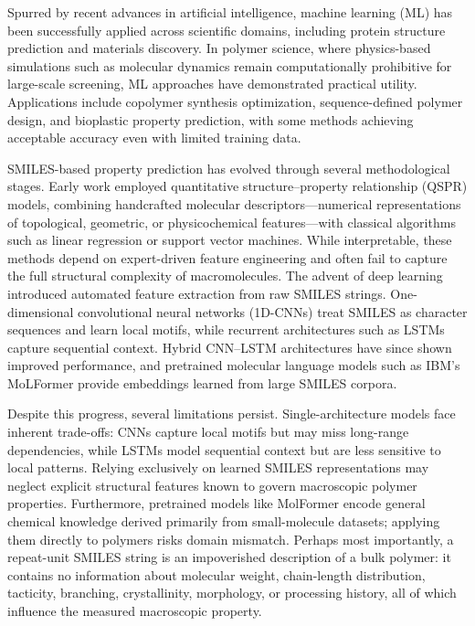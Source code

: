 \documentclass{article}
\begin{document}
Spurred by recent advances in artificial intelligence, machine learning (ML) has been successfully applied across scientific domains, including protein structure prediction and materials discovery.\cite{martin_emerging_2023, ge_machine_2025} In polymer science, where physics-based simulations such as molecular dynamics remain computationally prohibitive for large-scale screening, ML approaches have demonstrated practical utility.\cite{martin_emerging_2023, ge_machine_2025} Applications include copolymer synthesis optimization,\cite{reis_machine-learning-guided_2021} sequence-defined polymer design,\cite{webb_targeted_2020} and bioplastic property prediction,\cite{kuenneth_bioplastic_2022} with some methods achieving acceptable accuracy even with limited training data.\cite{kuenneth_bioplastic_2022}

SMILES-based property prediction has evolved through several methodological stages. Early work employed quantitative structure--property relationship (QSPR) models, combining handcrafted molecular descriptors---numerical representations of topological, geometric, or physicochemical features---with classical algorithms such as linear regression or support vector machines.\cite{toropov_qspr_2004, toropov_smiles_2007} While interpretable, these methods depend on expert-driven feature engineering and often fail to capture the full structural complexity of macromolecules. The advent of deep learning introduced automated feature extraction from raw SMILES strings.\cite{dara_feature_2018} One-dimensional convolutional neural networks (1D-CNNs) treat SMILES as character sequences and learn local motifs, while recurrent architectures such as LSTMs capture sequential context.\cite{chen_predicting_2021,li_developing_2025} Hybrid CNN--LSTM architectures have since shown improved performance,\cite{li_developing_2025} and pretrained molecular language models such as IBM's MoLFormer provide embeddings learned from large SMILES corpora.\cite{ross_molformer_2022}

Despite this progress, several limitations persist. Single-architecture models face inherent trade-offs: CNNs capture local motifs but may miss long-range dependencies, while LSTMs model sequential context but are less sensitive to local patterns. Relying exclusively on learned SMILES representations may neglect explicit structural features known to govern macroscopic polymer properties. Furthermore, pretrained models like MolFormer encode general chemical knowledge derived primarily from small-molecule datasets; applying them directly to polymers risks domain mismatch. Perhaps most importantly, a repeat-unit SMILES string is an impoverished description of a bulk polymer: it contains no information about molecular weight, chain-length distribution, tacticity, branching, crystallinity, morphology, or processing history, all of which influence the measured macroscopic property.
\end{document}
